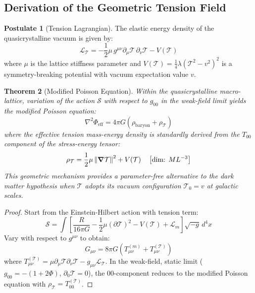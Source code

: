 \documentclass[12pt,a4paper,oneside]{article}
\theoremstyle{plain}
\newtheorem{theorem}{Theorem}[section]
\theoremstyle{definition}
\newtheorem{postulate}[theorem]{Postulate}
\theoremstyle{remark}
\newcommand{\vecnorm}[1]{\left\|#1\right\|}
\newcommand{\tension}{\mathcal{T}}
\newcommand{\Lag}{\mathcal{L}}
\newcommand{\Action}{\mathcal{S}}
\newcommand{\GNewton}{G}
\newcommand{\dimcheck}[1]{\quad \left[\text{dim: }#1\right]}
\begin{document}
\subsection{Derivation of the Geometric Tension Field}
\label{sec:tension_derivation}

\begin{postulate}[Tension Lagrangian]
\label{post:tension_lag}
The elastic energy density of the quasicrystalline vacuum is given by:
\begin{equation}
\Lag_{\tension} = -\frac{1}{2} \mu \, g^{\mu\nu} \partial_\mu \tension \, \partial_\nu \tension - V(\tension)
\end{equation}
where $\mu$ is the lattice stiffness parameter and $V(\tension) = \frac{1}{4}\lambda (\tension^2 - v^2)^2$ is a symmetry-breaking potential with vacuum expectation value $v$.
\end{postulate}

\begin{theorem}[Modified Poisson Equation]
\label{thm:galactic_tension}
Within the quasicrystalline macro-lattice, variation of the action $\Action$ with respect to $g_{00}$ in the weak-field limit yields the modified Poisson equation:
\begin{equation}
\nabla^2 \Phi_{\mathrm{eff}} = 4\pi \GNewton \left( \rho_{\mathrm{baryon}} + \rho_{\tension} \right)
\end{equation}
where the effective tension mass-energy density is standardly derived from the $T_{00}$ component of the stress-energy tensor:
\begin{equation}
\rho_{\tension} = \frac{1}{2} \mu \vecnorm{\grad \tension}^2 + V(\tension) \dimcheck{M L^{-3}}
\end{equation}
This geometric mechanism provides a parameter-free alternative to the dark matter hypothesis when $\tension$ adopts its vacuum configuration $\tension_0 = v$ at galactic scales.
\end{theorem}

\begin{proof}
Start from the Einstein-Hilbert action with tension term:
\begin{equation}
\Action = \int \left[ \frac{R}{16\pi\GNewton} - \frac{1}{2}\mu (\partial\tension)^2 - V(\tension) + \Lag_m \right] \sqrt{-g} \, d^4x
\end{equation}
Vary with respect to $g^{\mu\nu}$ to obtain:
\begin{equation}
G_{\mu\nu} = 8\pi\GNewton \left( T_{\mu\nu}^{(m)} + T_{\mu\nu}^{(\tension)} \right)
\end{equation}
where $T_{\mu\nu}^{(\tension)} = \mu \partial_\mu \tension \partial_\nu \tension - g_{\mu\nu} \Lag_{\tension}$. In the weak-field, static limit ($g_{00} = -(1+2\Phi)$, $\partial_0 \tension = 0$), the $00$-component reduces to the modified Poisson equation with $\rho_{\tension} = T_{00}^{(\tension)}$.
\end{proof}
\end{document}
